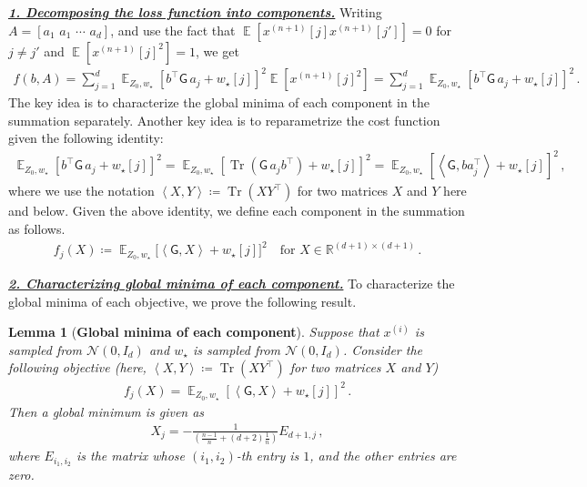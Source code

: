 \documentclass{article}
\DeclareMathOperator{\E}{\mathbb{E}}
\newcommand{\R}{\mathbb{R}}
\newtheorem{lemma}{Lemma}
\newcommand{\bb}{A}
\newcommand{\bbb}{a}
\newcommand{\cc}{b}
\newcommand{\wstar}{w_\star}
\newcommand{\tx}[1]{x^{(#1)}}
\newcommand{\MM}{\mathsf{G}}
\newcommand{\emphh}[1]{\textbf{\emph{#1}}}
\DeclareMathOperator{\tr}{Tr}
\newcommand{\inp}[2]{\left \langle #1,#2\right\rangle}
\begin{document}
\underline{\emphh{1. Decomposing the loss function into components.}}
Writing $\bb = [\bbb_1\,\, \bbb_1 \,\, \cdots \,\, \bbb_d ]$, and use the fact that $\E[\tx{n+1}[j]\tx{n+1}[j']] =0$ for $j\neq j'$ and $\E[\tx{n+1}[j]^2] =1$, we get
\begin{align}
f\left(\cc, \bb\right) = \sum_{j=1}^d \E_{Z_0,\wstar}\left[ \cc^\top \MM \,\bbb_j + \wstar[j] \right]^2 \E[\tx{n+1}[j]^2]  = \sum_{j=1}^d \E_{Z_0,\wstar}\left[ \cc^\top \MM \,\bbb_j  + \wstar[j] \right]^2 \,. 
\end{align}
The key idea is to characterize the global minima of each component in the summation separately.
Another key idea is to reparametrize the cost function  given the following identity:
\begin{align}
\E_{Z_0,\wstar}\left[ \cc^\top \MM \,\bbb_j  + \wstar[j] \right]^2 = \E_{Z_0,\wstar}\left[ \tr (\MM \,\bbb_j \cc^\top)  + \wstar[j] \right]^2= \E_{Z_0,\wstar}\left[\inp{\MM}{\cc \bbb_j^\top}  + \wstar[j] \right]^2\,,
\end{align}
where we use the notation $\inp{X}{Y} \coloneqq \tr(XY^\top)$ for two matrices $X$ and $Y$ here and below.
Given the above identity, we define each component in the summation as follows.
\begin{align}
\boxed{f_j(X)\coloneqq   \E_{Z_0,\wstar}\Big[\inp{\MM}{X}  + \wstar[j] \Big]^2\quad \text{for }  X\in \R^{(d+1)\times (d+1)}\,.}
\end{align} 

\underline{\emphh{2. Characterizing global minima of each component.}} 
To characterize the global minima of each objective, we prove the following result.

\begin{lemma}[\textbf{Global minima of each component}] \label{lem:component opt}
Suppose that $\tx{i}$ is sampled from $\mathcal{N}(0, I_d)$ and  $\wstar$ is sampled  from $\mathcal{N}(0, I_d)$.      Consider the following objective (here, $\inp{X}{Y} \coloneqq \tr(XY^\top)$ for two matrices $X$ and $Y$)
\begin{align}
f_j(X) =  \E_{Z_0,\wstar}\left[ \inp{\MM}{X}  + \wstar[j] \right]^2\,.
\end{align} 
Then a global minimum is given as 
\begin{align} \label{exp:opt_single}
X_j = - \frac{1}{\left( \frac{n-1}{n} +  (d+2) \frac{1}{n} \right)}E_{d+1,j}\,,
\end{align} where $E_{i_1,i_2}$ is the matrix whose $(i_1,i_2)$-th entry is $1$,  and the other entries are zero.
\end{lemma}
\end{document}
